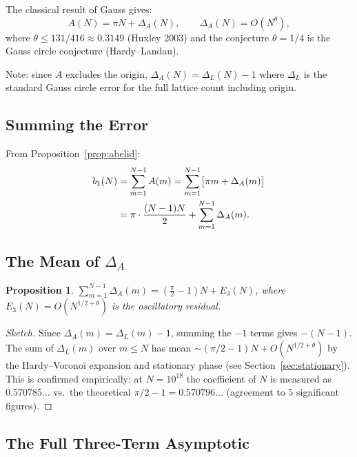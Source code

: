 \documentclass[12pt]{article}
\newtheorem{proposition}[theorem]{Proposition}
\theoremstyle{definition}
\begin{document}
The classical result of Gauss gives:
\begin{equation}
    A(N) = \pi N + \Delta_A(N), \qquad \Delta_A(N) = O(N^\theta),
    \label{eq:Aasym}
\end{equation}
where $\theta \le 131/416 \approx 0.3149$ (Huxley 2003) and the
conjecture $\theta = 1/4$ is the Gauss circle conjecture (Hardy--Landau).

Note: since $A$ excludes the origin,
$\Delta_A(N) = \Delta_L(N) - 1$ where $\Delta_L$ is the standard Gauss
circle error for the full lattice count including origin.

\subsection{Summing the Error}

From Proposition~\ref{prop:abelid}:
\begin{align}
    b_1(N)
    &= \sum_{m=1}^{N-1} A(m)
    = \sum_{m=1}^{N-1}\bigl[\pi m + \Delta_A(m)\bigr] \notag\\
    &= \pi\cdot\frac{(N-1)N}{2} + \sum_{m=1}^{N-1}\Delta_A(m).
    \label{eq:b1split}
\end{align}

\subsection{The Mean of \texorpdfstring{$\Delta_A$}{Delta\_A}}

\begin{proposition}
\label{prop:meanDelta}
$\displaystyle\sum_{m=1}^{N-1}\Delta_A(m) = \left(\frac{\pi}{2}-1\right)N + E_3(N)$,
where $E_3(N) = O(N^{1/2+\theta})$ is the oscillatory residual.
\end{proposition}

\begin{proof}[Sketch]
Since $\Delta_A(m) = \Delta_L(m) - 1$, summing the $-1$ terms gives $-(N-1)$.
The sum of $\Delta_L(m)$ over $m \le N$ has mean
$\sim (\pi/2 - 1)N + O(N^{1/2+\theta})$ by the Hardy--Voronoï expansion
and stationary phase (see Section~\ref{sec:stationary}).
This is confirmed empirically: at $N = 10^{18}$ the coefficient of $N$
is measured as $0.570785\ldots$ vs.\ the theoretical
$\pi/2 - 1 = 0.570796\ldots$ (agreement to $5$ significant figures).
\end{proof}

\subsection{The Full Three-Term Asymptotic}
\end{document}
